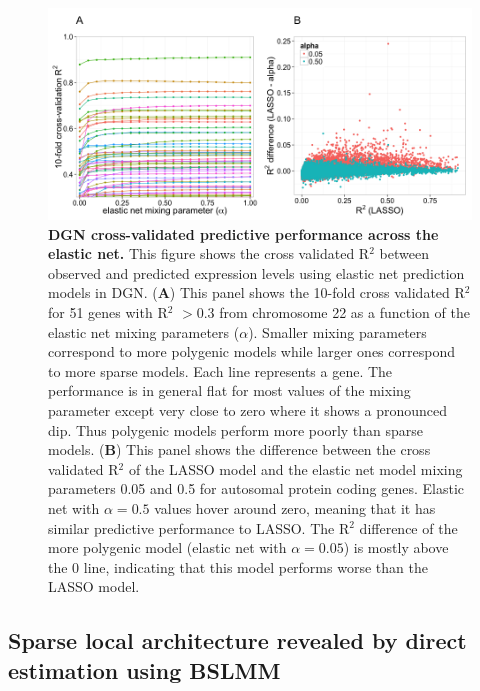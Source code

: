 \documentclass[10pt,letterpaper]{article}
\begin{document}
\begin{figure}[H]
\includegraphics[width=12cm]{Figures/Fig-DGN-EN.png}
\caption{{\bf DGN cross-validated predictive performance across the elastic net.} 
This figure shows the cross validated R$^2$ between observed and predicted expression levels using elastic net prediction models in DGN. (\textbf{A}) This panel shows the 10-fold cross validated R$^2$ for 51 genes with R$^2$ $>0.3$ from chromosome 22 as a function of the elastic net mixing parameters (\(\alpha\)). Smaller mixing parameters correspond to more polygenic models while larger ones correspond to more sparse models. Each line represents a gene. The performance is in general flat for most values of the mixing parameter except very close to zero where it shows a pronounced dip. Thus polygenic models perform more poorly than sparse models. (\textbf{B}) This panel shows the difference between the cross validated R$^2$ of the LASSO model and the elastic net model mixing parameters 0.05 and 0.5 for autosomal protein coding genes. Elastic net with $\alpha=0.5$ values hover around zero, meaning that it has similar predictive performance to LASSO. The R$^2$ difference of the more polygenic model (elastic net with $\alpha=0.05$) is mostly above the 0 line, indicating that this model performs worse than the LASSO model.
%
}
\label{fig-dgn-en}
\end{figure}

\subsection*{Sparse local architecture revealed by direct estimation using BSLMM}
\end{document}
